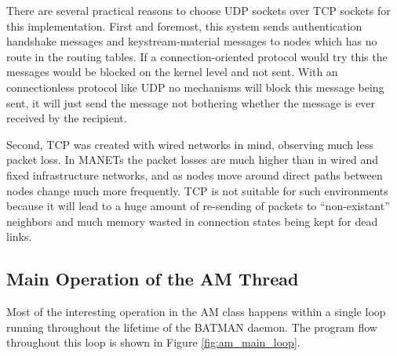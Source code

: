 There are several practical reasons to choose UDP sockets over TCP sockets for
this implementation. First and foremost, this system sends authentication
handshake messages and keystream-material messages to nodes which has no route
in the routing tables. If a connection-oriented protocol would try this the
messages would be blocked on the kernel level and not sent. With an
connectionless protocol like UDP no mechanisms will block this message being
sent, it will just send the message not bothering whether the message is ever
received by the recipient.

Second, TCP was created with wired networks in mind, observing much less packet
loss. In \acp{MANET} the packet losses are much higher than in wired and fixed
infrastructure networks, and as nodes move around direct paths between nodes
change much more frequently. TCP is not suitable for such environments because
it will lead to a huge amount of re-sending of packets to ``non-existant''
neighbors and much memory wasted in connection states being kept for dead links.

\subsection{Main Operation of the AM Thread}
Most of the interesting operation in the AM class happens within a single loop
running throughout the lifetime of the BATMAN daemon. The program flow
throughout this loop is shown in Figure \ref{fig:am_main_loop}.

